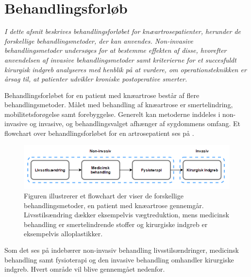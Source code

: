 \section{Behandlingsforløb}
\textit{I dette afsnit beskrives behandlingsforløbet for knæartrosepatienter, herunder de forskellige behandlingsmetoder, der kan anvendes. Non-invasive behandlingsmetoder undersøges for at bestemme effekten af disse, hvorefter anvendelsen af invasive behandlingsmetoder samt kriterierne for et succesfuldt kirurgisk indgreb analyseres med henblik på at vurdere, om operationsteknikken er årsag til, at patienter udvikler kroniske postoperative smerter.}

Behandlingsforløbet for en patient med knæartrose består af flere behandlingsmetoder. Målet med behandling af knæartrose er smertelindring, mobilitetsforøgelse samt forebyggelse. Generelt kan metoderne inddeles i non-invasive og invasive, og behandlingsvalget afhænger af sygdommens omfang. \citep{Lind2016b} Et flowchart over behandlingsforløbet for en artrosepatient ses på . 

\begin{figure}[H]
	\centering
	\includegraphics[width=1\textwidth]{figures/bProblemanalyse/flowchart_behandlingsforloeb_rettet.png}
	\caption{Figuren illustrerer et flowchart der viser de forskellige behandlingsmetoder, en patient med knæartrose gennemgår. Livsstilsændring dækker eksempelvis vægtreduktion, mens medicinsk behandling er smertelindrende stoffer og kirurgiske indgreb er eksempelvis alloplastikker. \citep{Lind2016b}}
	\label{fig:flow_behandlingsfaser}
\end{figure}\vspace{-.25cm}

Som det ses på  indebærer non-invasiv behandling livsstilsændringer, medicinsk behandling samt fysioterapi og den invasive behandling omhandler kirurgiske indgreb. Hvert område vil blive gennemgået nedenfor.  

